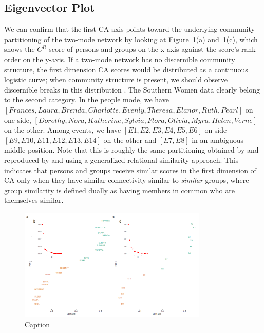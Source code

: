 \documentclass[a4paper,fleqn]{cas-sc}
\begin{document}
\subsection{Eigenvector Plot}
We can confirm that the first CA axis points toward the underlying community partitioning of the two-mode network by looking at Figure~\ref{fig:eigvec}(a) and~\ref{fig:eigvec}(c), which shows the $C^R$ score of persons and groups on the x-axis against the score's rank order on the y-axis. If a two-mode network has no discernible community structure, the first dimension CA scores would be distributed as a continuous logistic curve; when community structure is present, we should observe discernible breaks in this distribution \citep{van2021correspondence}. The Southern Women data clearly belong to the second category. In the people mode, we have $\left[Frances, Laura, Brenda, Charlotte, Evenly, Theresa, Elanor, Ruth, Pearl\right]$ on one side, $\left[Dorothy, Nora, Katherine, Sylvia, Flora, Olivia, Myra, Helen, Verne\right]$ on the other. Among events, we have $\left[E1, E2, E3, E4, E5, E6\right]$ on side $\left[E9, E10, E11, E12, E13, E14\right]$ on the other and $\left[E7, E8\right]$ in an ambiguous middle position. Note that this is roughly the same partitioning obtained by \citep{doreian2004generalized} and reproduced by \citet{kovacs2010generalized} and \citet{lizardo2024two} using a generalized relational similarity approach. This indicates that persons and groups receive similar scores in the first dimension of CA only when they have similar connectivity similar to \textit{similar} groups, where group similarity is defined dually as having members in common who are themselves similar. 

\begin{figure}
    \centering
    \includegraphics[width=0.8\textwidth]{Plots/eigvec.png}
    \caption{Caption}
    \label{fig:eigvec}
\end{figure}
\end{document}
